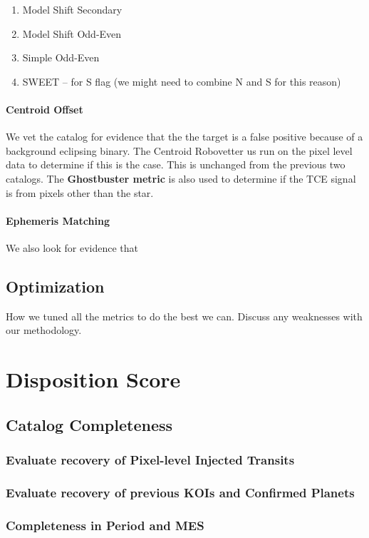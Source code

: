 \documentclass[onecolumn]{aastex6}
\begin{document}
\begin{enumerate}
\item Model Shift Secondary
\item Model Shift Odd-Even
\item Simple Odd-Even
\item SWEET -- for S flag (we might need to combine N and S for this reason)
\end{enumerate}


\paragraph{Centroid Offset} We vet the catalog for evidence that the the target is a false positive because of a background eclipsing binary. The Centroid Robovetter us run on the pixel level data to determine if this is the case.  This is unchanged from the previous two catalogs.  The \textbf{Ghostbuster metric} is also used to determine if the TCE signal is from pixels other than the star.

\paragraph{Ephemeris Matching} We also look for evidence that 


\subsection{Optimization}
How we tuned all the metrics to do the best we can.
Discuss any weaknesses with our methodology.

\section{Disposition Score}
\label{s:score}

\subsection{Catalog Completeness}
\subsubsection{Evaluate recovery of Pixel-level Injected Transits}
\subsubsection{Evaluate recovery of previous KOIs and Confirmed Planets}
\subsubsection{Completeness in Period and MES}
\end{document}
